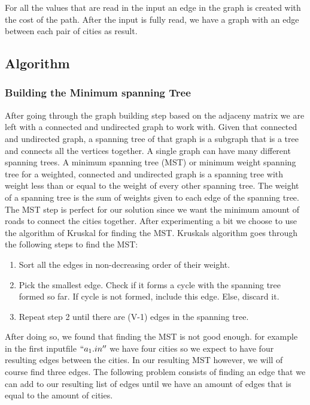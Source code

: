 \documentclass{article}
\begin{document}
For all the values that are read in the input an edge in the graph is created with the cost of the path. After the input is fully read, we have a graph with an edge between each pair of cities as result.

\newpage
\subsection{Algorithm}
\subsubsection{Building the Minimum spanning Tree}
After going through the graph building step based on the adjaceny matrix we are left with a connected and undirected graph to work with. Given that connected and undirected graph, a spanning tree of that graph is a subgraph that is a tree and connects all the vertices together. A single graph can have many different spanning trees. A minimum spanning tree (MST) or minimum weight spanning tree for a weighted, connected and undirected graph is a spanning tree with weight less than or equal to the weight of every other spanning tree. The weight of a spanning tree is the sum of weights given to each edge of the spanning tree.
\newline
\newline
The MST step is perfect for our solution since we want the minimum amount of roads to connect the cities together. After experimenting a bit we choose to use the algorithm of Kruskal for finding the MST. Kruskals algorithm goes through the following steps to find the MST:
\begin{enumerate}
  \item Sort all the edges in non-decreasing order of their weight.
  \item Pick the smallest edge. Check if it forms a cycle with the spanning tree formed so far. If cycle is not formed, include this edge. Else, discard it.
  \item Repeat step 2 until there are (V-1) edges in the spanning tree.
\end{enumerate}

After doing so, we found that finding the MST is not good enough. for example in the first inputfile $``a_1.in''$ we have four cities so we expect to have four resulting edges between the cities. In our resulting MST however, we will of course find three edges. The following problem consists of finding an edge that we can add to our resulting list of edges until we have an amount of edges that is equal to the amount of cities.
\end{document}
